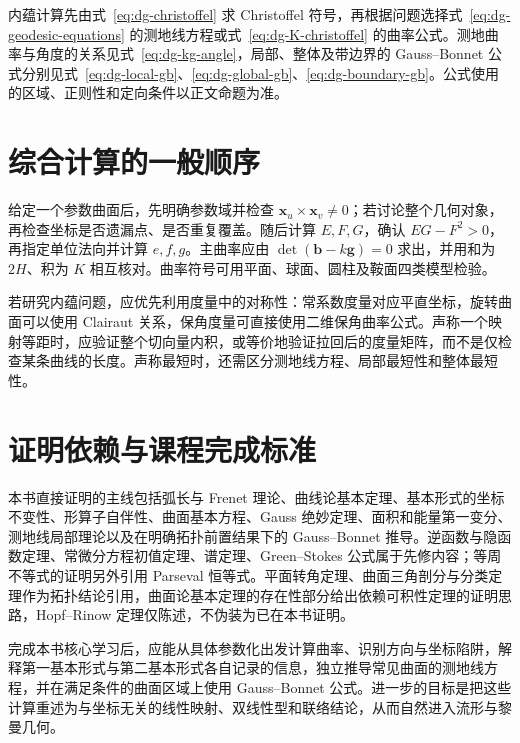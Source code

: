 内蕴计算先由式~\eqref{eq:dg-christoffel} 求 Christoffel 符号，再根据问题选择式~\eqref{eq:dg-geodesic-equations} 的测地线方程或式~\eqref{eq:dg-K-christoffel} 的曲率公式。测地曲率与角度的关系见式~\eqref{eq:dg-kg-angle}，局部、整体及带边界的 Gauss--Bonnet 公式分别见式~\eqref{eq:dg-local-gb}、\eqref{eq:dg-global-gb}、\eqref{eq:dg-boundary-gb}。公式使用的区域、正则性和定向条件以正文命题为准。

\section{综合计算的一般顺序}
给定一个参数曲面后，先明确参数域并检查 $\mathbf x_u\times\mathbf x_v\ne0$；若讨论整个几何对象，再检查坐标是否遗漏点、是否重复覆盖。随后计算 $E,F,G$，确认 $EG-F^2>0$，再指定单位法向并计算 $e,f,g$。主曲率应由 $\det(\mathbf b-k\mathbf g)=0$ 求出，并用和为 $2H$、积为 $K$ 相互核对。曲率符号可用平面、球面、圆柱及鞍面四类模型检验。

若研究内蕴问题，应优先利用度量中的对称性：常系数度量对应平直坐标，旋转曲面可以使用 Clairaut 关系，保角度量可直接使用二维保角曲率公式。声称一个映射等距时，应验证整个切向量内积，或等价地验证拉回后的度量矩阵，而不是仅检查某条曲线的长度。声称最短时，还需区分测地线方程、局部最短性和整体最短性。

\section{证明依赖与课程完成标准}
本书直接证明的主线包括弧长与 Frenet 理论、曲线论基本定理、基本形式的坐标不变性、形算子自伴性、曲面基本方程、Gauss 绝妙定理、面积和能量第一变分、测地线局部理论以及在明确拓扑前置结果下的 Gauss--Bonnet 推导。逆函数与隐函数定理、常微分方程初值定理、谱定理、Green--Stokes 公式属于先修内容；等周不等式的证明另外引用 Parseval 恒等式。平面转角定理、曲面三角剖分与分类定理作为拓扑结论引用，曲面论基本定理的存在性部分给出依赖可积性定理的证明思路，Hopf--Rinow 定理仅陈述，不伪装为已在本书证明。

完成本书核心学习后，应能从具体参数化出发计算曲率、识别方向与坐标陷阱，解释第一基本形式与第二基本形式各自记录的信息，独立推导常见曲面的测地线方程，并在满足条件的曲面区域上使用 Gauss--Bonnet 公式。进一步的目标是把这些计算重述为与坐标无关的线性映射、双线性型和联络结论，从而自然进入流形与黎曼几何。

